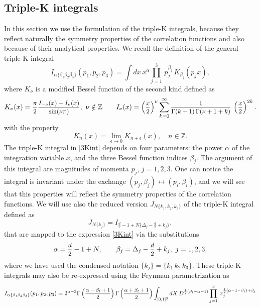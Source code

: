 \documentclass[a4paper,11pt,openright,twoside]{book}
\let\a=\alpha   \let\b=\beta   \let\g=\gamma   \let\d=\delta
\let\e=\epsilon \let\z=\zeta   \let\h=\eta     \let\q=\theta
\let\n=\nu      \let\x=\xi     \let\p=\pi      \let\r=\rho
\let\G=\Gamma  \let\D=\Delta \let\Q=\Theta  \let\L=\Lambda
\newcommand{\sdfrac}[2]{\mbox{\small$\displaystyle\frac{#1}{#2}$}}
\numberwithin{equation}{section}
\begin{document}
{{{\subsection{Triple-K integrals}
In this section we use the formulation of the triple-K integrals, because they reflect naturally the symmetry properties of the correlation functions and also because of their analytical properties. 
We recall the definition of the general triple-K integral
\begin{equation}
	I_{\a\{\b_1\b_2\b_3\}}(p_1,p_2,p_3)=\int dx \,x^\a\prod_{j=1}^{3}\,p_j^{\b_j}\,K_{\b_j}(p_jx),\label{3Kint}
\end{equation}
where $K_\n$ is a modified Bessel function of the second kind defined as
\begin{equation}
	K_\n(x)=\sdfrac{\pi}{2}\sdfrac{I_{-\n}(x)-I_\n(x)}{\sin(\n\pi)},\ \n\notin\mathbb Z\qquad I_\n(x)=\left(\sdfrac{x}{2}\right)^{\n}\sum_{k=0}^\infty\sdfrac{1}{\G(k+1)\,\G(\n+1+k)}\,\left(\sdfrac{x}{2}\right)^{2k}.\label{Kdef}
\end{equation} 
with the property 
\begin{equation}
	K_n(x)=\lim_{\e\to0}K_{n+\e}(x),\quad n\in\mathbb Z.
\end{equation}
The triple-K integral in \eqref{3Kint} depends on four parameters: the power $\a$ of the integration variable $x$, and the three Bessel function indices $\b_j$. The argument of this integral are magnitudes of momenta $p_j$, $j=1,2,3$. One can notice the integral is invariant under the exchange $(p_j,\beta_j)\leftrightarrow(p_i,\beta_i)$, and we will see that this properties will reflect the symmetry properties of the correlation functions. We will use also the reduced version $J_{N\{k_1,k_2,k_3\}}$ of the triple-K integral defined as
\begin{equation}
	J_{N\{k_j\}}=I_{\frac{d}{2}-1+N\{\D_j-\frac{d}{2}+k_j\}},\label{defJintegr}
\end{equation}
that are mapped to the expression \eqref{3Kint} via the substitutions
\begin{equation}
	\a=\sdfrac{d}{2}-1+N,\qquad \b_j=\D_j-\sdfrac{d}{2}+k_j,\ j=1,2,3,
\end{equation}
where we have used the condensed notation $\{k_j\}=\{k_1\,k_2\,k_3\}$. These triple-K integrals may also be re-expressed using the Feynman parametrization as
\begin{equation}
	I_{\a\{\b_1\b_2\b_3\}}(p_1,p_2,p_3)=2^{\a-3}\G\left(\sdfrac{\a-\b_t+1}{2}\right)\G\left(\sdfrac{\a+\b_t+1}{2}\right)\int_{[0,1]^3}dX\,D^{\frac{1}{2}(\b_t-\a-1)}\prod_{j=1}^3\,x_j^{\frac{1}{2}(\a-1-\b_t)+\b_j}\label{Feyn}

\end{equation}}}}
\end{document}
